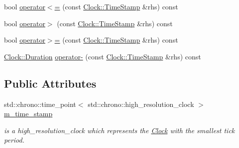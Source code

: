 \begin{DoxyCompactItemize}
bool \hyperlink{class_clock_1_1_time_stamp_ab996a7b3a3263f910fe9ab2dcc898086}{operator$<$=} (const \hyperlink{class_clock_1_1_time_stamp}{Clock\+::\+Time\+Stamp} \&rhs) const 
\item 
bool \hyperlink{class_clock_1_1_time_stamp_a1cfe16526337665c231ed0d94d065c60}{operator$>$} (const \hyperlink{class_clock_1_1_time_stamp}{Clock\+::\+Time\+Stamp} \&rhs) const 
\item 
bool \hyperlink{class_clock_1_1_time_stamp_a17898988ef47d11f1accad6bf58c9d8c}{operator$>$=} (const \hyperlink{class_clock_1_1_time_stamp}{Clock\+::\+Time\+Stamp} \&rhs) const 
\item 
\hyperlink{class_clock_1_1_duration}{Clock\+::\+Duration} \hyperlink{class_clock_1_1_time_stamp_a4b876a2d43a8da209174123cfcd77218}{operator-\/} (const \hyperlink{class_clock_1_1_time_stamp}{Clock\+::\+Time\+Stamp} \&rhs) const 
\end{DoxyCompactItemize}
\subsection*{Public Attributes}
\begin{DoxyCompactItemize}
\item 
std\+::chrono\+::time\+\_\+point$<$ std\+::chrono\+::high\+\_\+resolution\+\_\+clock $>$ \hyperlink{class_clock_1_1_time_stamp_a6de590697ea903decd70a91bcc9d4a54}{m\+\_\+time\+\_\+stamp}
\begin{DoxyCompactList}\small\item\em is a high\+\_\+resolution\+\_\+clock which represents the \hyperlink{class_clock}{Clock} with the smallest tick period. \end{DoxyCompactList}\end{DoxyCompactItemize}
